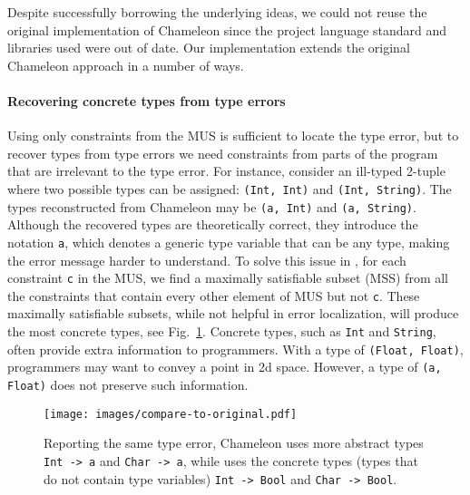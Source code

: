 Despite successfully borrowing the underlying ideas, we could not reuse the original implementation of Chameleon since the project language standard and libraries used were out of date. 
Our \chameleon{} implementation extends the original Chameleon approach in a number of ways.



\paragraph{Recovering concrete types from type errors}


Using only constraints from the MUS is sufficient to locate the type error, but to recover types from type errors we need constraints from parts of the program that are irrelevant to the type error.  For instance, consider an ill-typed 2-tuple where two possible types can be assigned: \texttt{(Int, Int)} and \texttt{(Int, String)}. The types reconstructed from Chameleon may be \texttt{(a, Int)} and \texttt{(a, String)}. Although the recovered types are theoretically correct, they introduce the notation \texttt{a}, which denotes a generic type variable that can be any type, making the error message harder to understand. To solve this issue in \chameleon{}, for each constraint \texttt{c} in the MUS, we find a maximally satisfiable subset (MSS) from all the constraints that contain every other element of MUS but not \texttt{c}. These maximally satisfiable subsets, while not helpful in error localization, will produce the most concrete types, see Fig.~\ref{fig:compare-to-original}. Concrete types, such as \texttt{Int} and \texttt{String},  often provide extra information to programmers. With a type of \texttt{(Float, Float)}, programmers may want to convey a point in 2d space. However, a type of \texttt{(a, Float)} does not preserve such information.


\begin{figure}
    \centering
    \texttt{[image: images/compare-to-original.pdf]}
    \caption{
Reporting the same type error, Chameleon uses more abstract types
\texttt{Int -> a} and \texttt{Char -> a}, while \chameleon{} uses the 
concrete types (types that do not contain type variables) \texttt{Int -> Bool} and \texttt{Char -> Bool}.
    }
    \label{fig:compare-to-original}
\end{figure}

